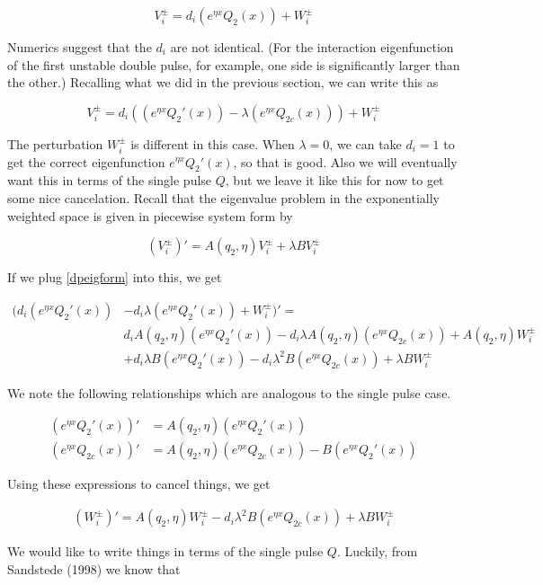 \documentclass[12pt]{article}
\begin{document}
\[
V_i^\pm = d_i (e^{\eta x}Q_2(x)) + W_i^\pm 
\]

Numerics suggest that the $d_i$ are not identical. (For the interaction eigenfunction of the first unstable double pulse, for example, one side is significantly larger than the other.) Recalling what we did in the previous section, we can write this as

\begin{equation}\label{dpeigform}
V_i^\pm = d_i( (e^{\eta x}Q_2'(x)) - \lambda (e^{\eta x}Q_{2c}(x)) ) + W_i^\pm
\end{equation}

The perturbation $W_i^\pm$ is different in this case. When $\lambda = 0$, we can take $d_i = 1$ to get the correct eigenfunction $e^{\eta x}Q_2'(x)$, so that is good. Also we will eventually want this in terms of the single pulse $Q$, but we leave it like this for now to get some nice cancelation. Recall that the eigenvalue problem in the exponentially weighted space is given in piecewise system form by

\[
(V_i^\pm)' = A(q_2, \eta)V_i^\pm + \lambda B V_i^\pm
\]

If we plug \eqref{dpeigform} into this, we get 

\begin{align*}
(d_i (e^{\eta x}Q_2'(x)) &- d_i \lambda (e^{\eta x}Q_2'(x)) + W_i^\pm)' = \\
& d_i A(q_2, \eta) (e^{\eta x}Q_2'(x)) - d_i \lambda A(q_2, \eta)(e^{\eta x}Q_{2c}(x))
+ A(q_2, \eta) W_i^\pm \\
&+ d_i \lambda B (e^{\eta x}Q_2'(x)) - d_i \lambda^2 B (e^{\eta x}Q_{2c}(x)) 
+ \lambda B W_i^\pm 
\end{align*}

We note the following relationships which are analogous to the single pulse case.

\begin{align*}
(e^{\eta x}Q_2'(x))' &= A(q_2,\eta)(e^{\eta x}Q_2'(x)) \\
(e^{\eta x}Q_{2c}(x))' &= A(q_2, \eta)(e^{\eta x}Q_{2c}(x)) - B (e^{\eta x}Q_2'(x))  
\end{align*} 


Using these expressions to cancel things, we get

\begin{align*}
(W_i^\pm)' = A(q_2, \eta) W_i^\pm - d_i \lambda^2 B (e^{\eta x}Q_{2c}(x)) 
+ \lambda B W_i^\pm 
\end{align*}

We would like to write things in terms of the single pulse $Q$. Luckily, from Sandstede (1998) we know that
\end{document}
